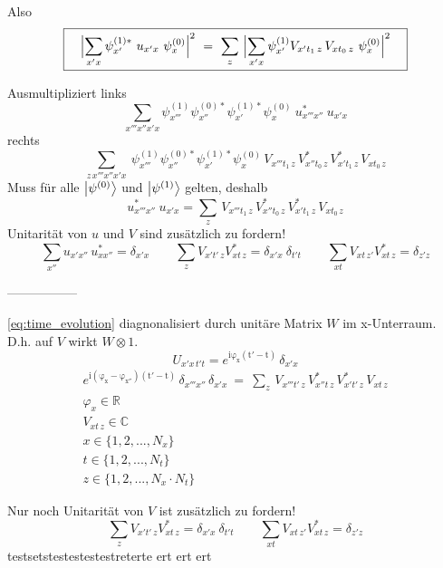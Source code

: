 \documentclass[12pt]{article}
\begin{document}
Also 
\begin{equation} 
\boxed{
\quad\Bigl| \sum_{x'x} \psi^{(1)*}_{x'}\ u_{x'x}\ \psi^{(0)}_x \Bigr|^2 
\ =\ \sum_{z}\ \Bigl|\sum_{x'x} \psi^{(1)}_{x'} V_{x't_1\, z}\, V_{xt_0\, z}\ \psi^{(0)}_{x} \Bigr|^2 \quad
}
\end{equation}

Ausmultipliziert links
\begin{equation} 
\sum_{x'''x''x'x}\psi^{(1)}_{x'''}\psi^{(0)*}_{x''}\psi^{(1)*}_{x'}\psi^{(0)}_x
\ u^*_{x'''x''}\ u_{x'x}
\end{equation}
rechts
\begin{equation} 
\sum_{z\,x'''x''x'x}\ 
\psi^{(1)}_{x'''}\psi^{(0)*}_{x''}\psi^{(1)*}_{x'}\psi^{(0)}_{x}
\, V_{x'''t_1\, z}\, V^*_{x''t_0\, z}\, V^*_{x't_1\, z}\, V_{xt_0\, z}
\end{equation}
Muss für alle $\ket{\psi^{(0)}}$ und $\ket{\psi^{(1)}}$ gelten, deshalb
\begin{equation} 
\boxed{
u^*_{x'''x''}\ u_{x'x} = \sum_z \, V_{x'''t_1\, z}\, V^*_{x''t_0\, z}\, V^*_{x't_1\, z}\, V_{xt_0\, z} 
}
\end{equation}
Unitarität von $u$ und $V$ sind zusätzlich zu fordern!
\begin{equation} 
\sum_{x''} u_{x'x''}\, u^*_{xx''} = \delta_{x'x} \quad\quad 
\sum_{z} V_{x't'\, z} V^*_{xt\, z} = \delta_{x'x}\ \delta_{t't} \quad\quad
\sum_{xt} V_{xt\, z'} V^*_{xt\, z} = \delta_{z'z}
\end{equation}

-----------------

\eqref{eq:time_evolution} diagnonalisiert durch unitäre Matrix $W$ im x-Unterraum. D.h. auf $V$ wirkt $W \otimes \mathrm{1}$.
\begin{equation}
U_{x'x\,t't} = e^\mathrm{i\varphi_x(t'-t)}\,\delta_{x'x}
\end{equation}
\begin{equation}
\begin{split}
\boxed{
e^\mathrm{i(\varphi_x-\varphi_{x''})(t'-t)}\,\delta_{x'''x''}\,\delta_{x'x}\ =\ \sum_z \, V_{x'''t'\, z}\, V^*_{x''t\, z}\, V^*_{x't'\, z}\, V_{xt\, z} 
} \\
\varphi_x \in \mathbb{R} \\ V_{xt\, z} \in \mathbb{C} \\
x \in \{1,2,...,N_x\}\\ t \in \{1,2,...,N_t\}\\ z \in \{1,2,...,N_x \cdot N_t\} 
\end{split}
\end{equation}

Nur noch Unitarität von $V$ ist zusätzlich zu fordern!
\begin{equation} 
\sum_{z} V_{x't'\, z} V^*_{xt\, z} = \delta_{x'x}\ \delta_{t't} \quad\quad
\sum_{xt} V_{xt\, z'} V^*_{xt\, z} = \delta_{z'z}
\end{equation}
testsetstestestestestreterte 
ert
ert
ert
\end{document}

